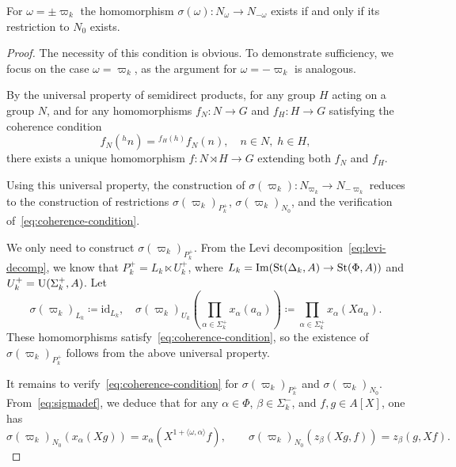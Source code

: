 \begin{lemma} \label{lem:first-reduction}
For $\omega = \pm \varpi_k$ the homomorphism $\sigma(\omega)\colon N_\omega \to N_{-\omega}$ exists if and only if its restriction to $N_0$ exists.
\end{lemma}
\begin{proof}
    The necessity of this condition is obvious.
    To demonstrate sufficiency, we focus on the case $\omega = \varpi_k$, as the argument for $\omega = -\varpi_k$ is analogous.

    By the universal property of semidirect products, for any group $H$ acting on a group $N$, and for any homomorphisms $f_N\colon N \to G$ and $f_H\colon H \to G$ satisfying the coherence condition
    \begin{equation}
        \label{eq:coherence-condition}
        f_N({}^hn) = {}^{f_H(h)} f_N(n), \quad n \in N, \; h \in H,
    \end{equation}
    there exists a unique homomorphism $f\colon N \rtimes H \to G$ extending both $f_N$ and $f_H$.

    Using this universal property, the construction of \( \sigma(\varpi_k) \colon N_{\varpi_k} \to N_{-\varpi_k} \) reduces to the construction of
     restrictions \( \sigma(\varpi_k)_{P_k^+} \), \( \sigma(\varpi_k)_{N_0} \), and the verification of~\eqref{eq:coherence-condition}.

    We only need to construct \( \sigma(\varpi_k)_{P_k^+} \).
    From the Levi decomposition~\eqref{eq:levi-decomp}, we know that \( P_k^+ = L_k \ltimes U_k^+ \), where \( L_k = \mathrm{Im}(\operatorname{St}(\Delta_k, A) \to \operatorname{St}(\Phi, A)) \) and
     \( U_k^+ = \operatorname{U}(\Sigma_k^+, A) \).
    Let
    \begin{equation} \label{eq:sigma-Pk}
    \sigma(\varpi_k)_{L_k} \coloneqq \mathrm{id}_{L_k}, \quad
    \sigma(\varpi_k)_{U_k} \left(\prod_{\alpha \in \Sigma_k^+} x_\alpha(a_\alpha)\right) \coloneqq \prod_{\alpha \in \Sigma_k^+} x_\alpha(Xa_\alpha).
    \end{equation}
    These homomorphisms satisfy~\eqref{eq:coherence-condition}, so the existence of \( \sigma(\varpi_k)_{P_k^+} \) follows from the above universal property.

    It remains to verify~\eqref{eq:coherence-condition} for \( \sigma(\varpi_k)_{P_k^+} \) and \( \sigma(\varpi_k)_{N_0} \).
    From~\eqref{eq:sigmadef}, we deduce that for any \( \alpha \in \Phi \), \( \beta \in \Sigma_k^- \), and \( f, g \in A[X] \), one has
    \begin{equation} \label{eq:charact}
    \sigma(\varpi_k)_{N_0}(x_\alpha(Xg)) = x_\alpha(X^{1 + \langle \omega, \alpha \rangle}f), \qquad
    \sigma(\varpi_k)_{N_0}(z_\beta(Xg, f)) = z_\beta(g, Xf).
    \end{equation}


\end{proof}
